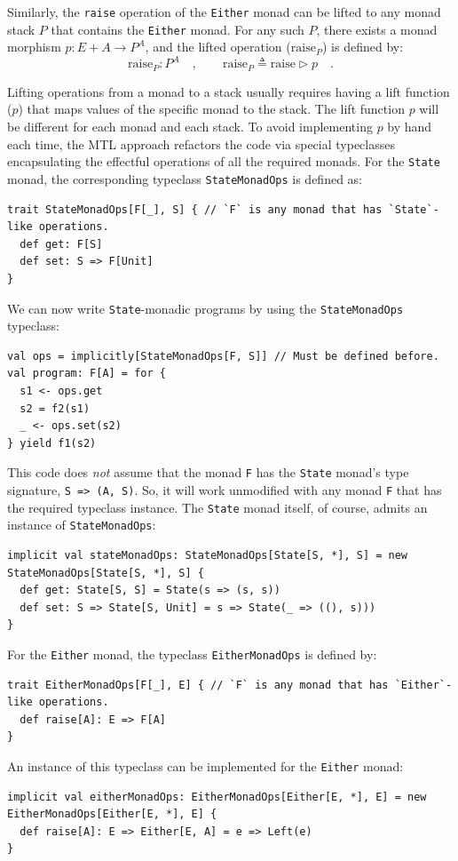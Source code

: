 Similarly, the \lstinline!raise! operation of the \lstinline!Either!
monad can be lifted to any monad stack $P$ that contains the \lstinline!Either!
monad. For any such $P$, there exists a monad morphism $p:E+A\rightarrow P^{A}$,
and the lifted operation ($\text{raise}_{P}$) is defined by:
\[
\text{raise}_{P}:P^{A}\quad,\quad\quad\text{raise}_{P}\triangleq\text{raise}\triangleright p\quad.
\]

Lifting operations from a monad to a stack usually requires having
a lift function ($p$) that maps values of the specific monad to the
stack. The lift function $p$ will be different for each monad and
each stack. To avoid implementing $p$ by hand each time, the MTL
approach refactors the code via special typeclasses encapsulating
the effectful operations of all the required monads. For the \lstinline!State!
monad, the corresponding typeclass \lstinline!StateMonadOps! is defined
as:
\begin{lstlisting}
trait StateMonadOps[F[_], S] { // `F` is any monad that has `State`-like operations.
  def get: F[S]
  def set: S => F[Unit]
}
\end{lstlisting}
We can now write \lstinline!State!-monadic programs by using the
\lstinline!StateMonadOps! typeclass:
\begin{lstlisting}
val ops = implicitly[StateMonadOps[F, S]] // Must be defined before.
val program: F[A] = for {
  s1 <- ops.get
  s2 = f2(s1)
  _ <- ops.set(s2)
} yield f1(s2)
\end{lstlisting}
This code does \emph{not} assume that the monad \lstinline!F! has
the \lstinline!State! monad\textsf{'}s type signature, \lstinline!S => (A, S)!.
So, it will work unmodified with any monad \lstinline!F! that has
the required typeclass instance. The \lstinline!State! monad itself,
of course, admits an instance of \lstinline!StateMonadOps!:
\begin{lstlisting}
implicit val stateMonadOps: StateMonadOps[State[S, *], S] = new StateMonadOps[State[S, *], S] {
  def get: State[S, S] = State(s => (s, s))
  def set: S => State[S, Unit] = s => State(_ => ((), s)))
}
\end{lstlisting}

For the \lstinline!Either! monad, the typeclass \lstinline!EitherMonadOps!
is defined by:
\begin{lstlisting}
trait EitherMonadOps[F[_], E] { // `F` is any monad that has `Either`-like operations.
  def raise[A]: E => F[A]
}
\end{lstlisting}
An instance of this typeclass can be implemented for the \lstinline!Either!
monad:
\begin{lstlisting}
implicit val eitherMonadOps: EitherMonadOps[Either[E, *], E] = new EitherMonadOps[Either[E, *], E] {
  def raise[A]: E => Either[E, A] = e => Left(e)
}
\end{lstlisting}

